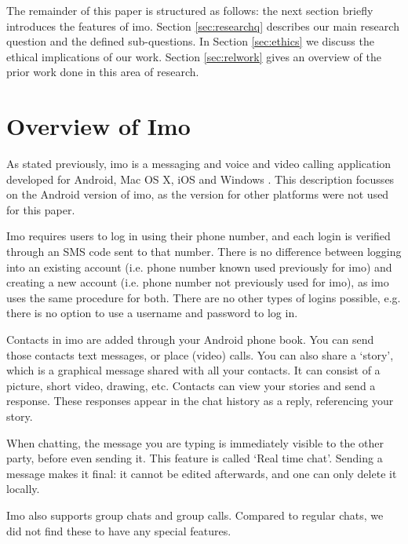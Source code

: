 \documentclass[conference]{IEEEtran}
\begin{document}
The remainder of this paper is structured as follows: the next section briefly
introduces the features of imo. Section \ref{sec:researchq} describes our main
research question and the defined sub-questions. In Section \ref{sec:ethics} we
discuss the ethical implications of our work. Section \ref{sec:relwork} gives
an overview of the prior work done in this area of research. %



\section{Overview of Imo}

As stated previously, imo is a messaging and voice and video calling application
developed for Android, Mac OS X, iOS and Windows \cite{imo}. This description
focusses on the Android version of imo, as the version for other platforms were
not used for this paper.

Imo requires users to log in using their phone number, and each login is
verified through an SMS code sent to that number. There is no difference between
logging into an existing account (i.e. phone number known used previously for
imo) and creating a new account (i.e. phone number not previously used for imo),
as imo uses the same procedure for both. There are no other types of logins
possible, e.g. there is no option to use a username and password to log in.

Contacts in imo are added through your Android phone book. You can send those
contacts text messages, or place (video) calls. You can also share a `story',
which is a graphical message shared with all your contacts. It can consist of a
picture, short video, drawing, etc. Contacts can view your stories and send a
response. These responses appear in the chat history as a reply, referencing
your story.

When chatting, the message you are typing is immediately visible to the other
party, before even sending it. This feature is called `Real time chat'. Sending
a message makes it final: it cannot be edited afterwards, and one can only
delete it locally.

Imo also supports group chats and group calls. Compared to regular chats, we
did not find these to have any special features.
\end{document}

